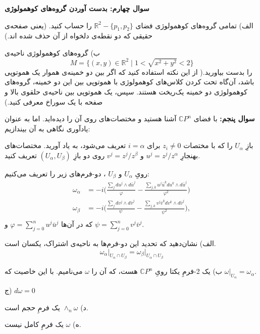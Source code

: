 \documentclass{article}
\newenvironment{parind}{%
	\par%
	\medskip
	\leftskip=0mm\rightskip=7mm
	\noindent\ignorespaces}{%
	\par\medskip}
\begin{document}
	\vspace{-1em}
	\endline
	
	\vspace{-1em}
	\textbf{سوال چهارم: بدست آوردن گروه‌های کوهمولوژی}
	\begin{parind}
		الف)
		تمامی گروه‌های کوهمولوژی فضای 
		$\mathbb{R}^2 - \{p_1,p_2\}$
		را حساب کنید. (یعنی صفحه‌ی حقیقی که دو نقطه‌ی دلخواه از آن حذف شده اند.)
		
		ب)
		گروه‌های کوهمولوژی ناحیه‌ی 
		\[M= \biggl\{
		(x,y) \in \mathbb{R}^2 \; | \; 1 < \sqrt{x^2+y^2} <2
		\biggr\}
		\]
		را بدست بیاورید.( از این نکته استفاده کنید که اگر بین دو خمینه‌ی هموار یک هموتوپی باشد، آن‌گاه تحت  کردن‌ کلاس‌های کوهمولوژی با هموتوپی بین این دو خمینه، گروه‌های کوهمولوژی دو خمینه یک‌ریخت هستند. سپس، یک هموتوپی بین ناحیه‌ی حلقوی بالا و صفحه با یک سوراخ معرفی کنید.)
		
		
		\vspace{-1em}
		\endline
	\end{parind}
	\vspace{-1em}
	\textbf{سوال پنجم:}
	با فضای 
	$\mathbb{C}P^n$ آشنا هستید و مختصات‌های روی آن را دیده‌اید. اما به عنوان یادآوری نگاهی به آن بیندازیم:
	\begin{mdframed}
		بازِ
		$U_\alpha$ را  که با مختصات
		 $z_i\neq 0$
		 برای
		 $i =  \alpha$
		 تعریف می‌شود، به یاد آورید. مختصات‌های بهنجارِ
		 $u^j = z^j/z^\alpha$ 
		 و 
		 $v^j = z^j/z^\beta$
		 روی دو بازِ
		 $(U_\alpha,U_\beta)$
		 تعریف کنید.
		 
		 رویِ 
		 $U_\alpha$
		 و
		 $U_\beta$
		 ، دو-فرم‌های زیر را تعریف می‌کنیم:
		 \begin{equation*}
		 	\begin{aligned}
		 		\omega_\alpha &= -i \Big(
		 		\frac{\sum_{j} du^j \wedge d\bar{u}^j}{\varphi} - \frac{\sum_{j,k}u^j\bar{u}^k du^k \wedge d\bar{u}^j}{\varphi^2}
		 		\Big) \\
		 		\omega_\beta &= -i \Big(
		 		\frac{\sum_{j} dv^j \wedge d\bar{v}^j}{\psi} - \frac{\sum_{j,k}v^j\bar{v}^k dv^k \wedge d\bar{v}^j}{\psi^2}
		 		\Big), \\ 
		 	\end{aligned}
		 \end{equation*}
		 که در آن‌ها
		 $\varphi = \sum_{j=0}^{n} u^j \bar{u}^j$
		   و
		   $\psi = \sum_{j=0}^{n} v^j \bar{v}^j$.
	\end{mdframed}
	\begin{parind}
		الف) نشان‌دهید که تحدید این دو-فرم‌ها به ناحیه‌ی اشتراک، یکسان است.
		\[
		\omega_\alpha \Big|_{U_\alpha \cap U_\beta} = \omega_\beta \Big|_{U_\alpha \cap U_\beta}
		\]
		
		\newpage
		ب) یک 2-فرمِ یکتا رویِ
		$\mathbb{C}P^n$
		هست، که آن را 
		$\omega$
		 می‌نامیم. با این خاصیت که 
		 $\omega\Big|_{U_\alpha} = \omega_\alpha$.
		 
		 ج) $d\omega=0$
		 
		 د) 
		 $\wedge_n \omega$
		 یک فرمِ حجم است.
		 
		 ه) $\omega$ یک فرمِ کامل نیست. 
	\end{parind}
		\vspace{-1em}
	\endline
\end{document}
